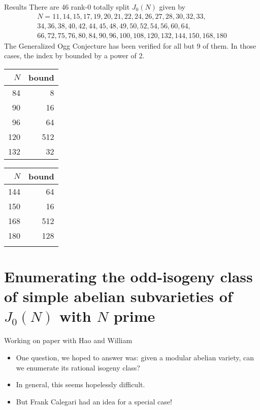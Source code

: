 \documentclass{beamer}
\begin{document}
\begin{frame}{Results}
    There are 46 rank-0 totally split $J_0(N)$ given by 
    \begin{gather*}
        N=11, 14, 15, 17, 19, 20, 21, 22, 24, 26, 27, 28, 30, 32, 33, \\
        34, 36, 38, 40, 42, 44, 45, 48, 49, 50, 52, 54, 56, 60, 64, \\
        66, 72, 75, 76, 80, 84, 90, 96, 100, 108, 120, 132, 144, 150, 168, 180
    \end{gather*}
    The Generalized Ogg Conjecture has been verified for all but 9 of them. In
    those cases, the index by bounded by a power of 2.
\begin{table}%
    \centering
    \begin{tabular}{rr}
        \toprule
        $N$ & bound \\
        \midrule
        84 & 8 \\
        90 & 16 \\
        96 & 64 \\
        120 & 512 \\
        132 & 32 \\
        \bottomrule
    \end{tabular}
    \begin{tabular}{rr}
        \toprule
        $N$ & bound \\
        \midrule
        144 & 64 \\
        150 & 16 \\
        168 & 512 \\
        180 & 128  \\
            &  \\
        \bottomrule
    \end{tabular}
\end{table}
\end{frame}

\section{Enumerating the odd-isogeny class of simple abelian subvarieties of
$J_0(N)$ with $N$ prime}

\begin{frame}{Working on paper with Hao and William}
    \begin{itemize}
        \item
            One question, we hoped to answer was: given a modular abelian
            variety, can we enumerate its rational isogeny class?
        \item
            In general, this seems hopelessly difficult.
        \item
            But Frank Calegari had an idea for a special case!
    \end{itemize}
\end{frame}
\end{document}
